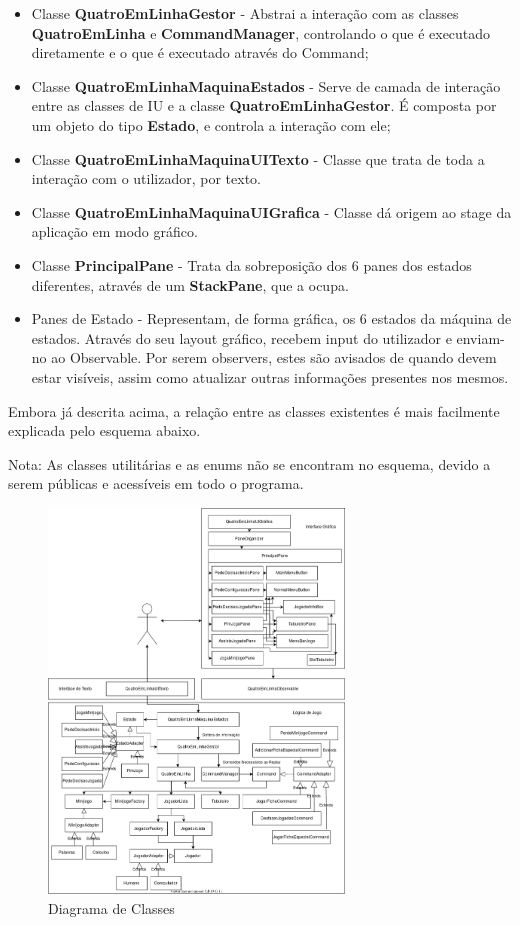 \documentclass[11pt]{article}
\begin{document}
\begin{itemize}
		\item Classe \textbf{QuatroEmLinhaGestor} - Abstrai a interação com as classes \textbf{QuatroEmLinha} e \textbf{CommandManager}, controlando o que é executado diretamente e o que é executado através do Command;
		\item Classe \textbf{QuatroEmLinhaMaquinaEstados} - Serve de camada de interação entre as classes de IU e a classe \textbf{QuatroEmLinhaGestor}. É composta por um objeto do tipo \textbf{Estado}, e controla a interação com ele;
		\item Classe \textbf{QuatroEmLinhaMaquinaUITexto} - Classe que trata de toda a interação com o utilizador, por texto.
		\item Classe \textbf{QuatroEmLinhaMaquinaUIGrafica} - Classe dá origem ao stage da aplicação em modo gráfico.
		\item Classe \textbf{PrincipalPane} - Trata da sobreposição dos 6 panes dos estados diferentes, através de um \textbf{StackPane}, que a ocupa.
		\item Panes de Estado - Representam, de forma gráfica, os 6 estados da máquina de estados. Através do seu layout gráfico, recebem input do utilizador e enviam-no ao Observable. Por serem observers, estes são avisados de quando devem estar visíveis, assim como atualizar outras informações presentes nos mesmos.
	\end{itemize}
	
	Embora já descrita acima, a relação entre as classes existentes é mais facilmente explicada pelo esquema abaixo.
	
	Nota: As classes utilitárias e as enums não se encontram no esquema, devido a serem públicas e acessíveis em todo o programa.
	
	\vspace{0.5cm}
	
	\begin{figure}[H]
		\includegraphics[width=0.7\textwidth]{diagrama-classes}
		\centering
		\caption{Diagrama de Classes}
		\label{fig:diag-classes}
	\end{figure}
\end{document}
